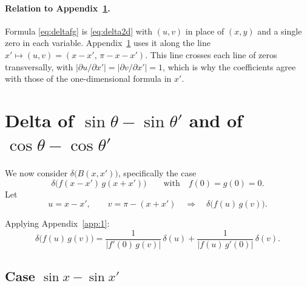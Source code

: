 \documentclass[11pt]{article}
\begin{document}
\paragraph{Relation to Appendix~\ref{app:2}.} Formula \eqref{eq:deltafg} is
\eqref{eq:delta2d} with $(u,v)$ in place of $(x,y)$ and a single zero in each
variable. Appendix~\ref{app:2} uses it along the line
$x'\mapsto(u,v)=(x-x',\,\pi-x-x')$. This line crosses each line of zeros
transversally, with $|\partial u/\partial x'|=|\partial v/\partial x'|=1$,
which is why the coefficients agree with those of the one-dimensional formula
in $x'$.

\section{Delta of $\sin\theta-\sin\theta'$ and of $\cos\theta-\cos\theta'$}
\label{app:2}

We now consider $\delta\bigl(B(x,x')\bigr)$, specifically the case
\[
  \delta\bigl(f(x-x')\,g(x+x')\bigr)\qquad\text{with}\quad f(0)=g(0)=0.
\]
Let
\[
  u=x-x',\qquad v=\pi-(x+x')
  \quad\Longrightarrow\quad
  \delta\bigl(f(u)\,g(v)\bigr).
\]

Applying Appendix~\ref{app:1}:
\begin{equation}\label{eq:deltafg}
  \delta\bigl(f(u)\,g(v)\bigr)=\frac{1}{|f'(0)\,g(v)|}\,\delta(u)
  +\frac{1}{|f(u)\,g'(0)|}\,\delta(v).
\end{equation}


\subsection{Case $\sin x-\sin x'$}
\end{document}
